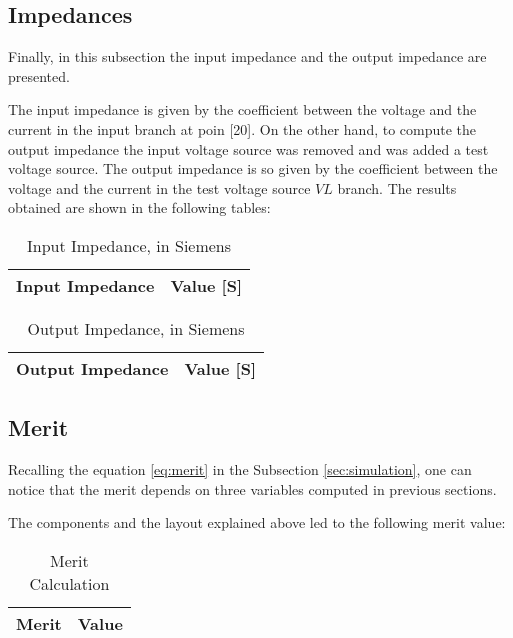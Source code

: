\subsection{Impedances}
\label{impedances}
\par Finally, in this subsection the input impedance and the output impedance are presented.
\par The input impedance is given by the coefficient between the voltage and the current in the input branch at poin [20]. On the other hand, to compute the output impedance the input voltage source was removed and was added a test voltage source. The output impedance is so given by the coefficient between the voltage and the current in the test voltage source $VL$ branch. The results obtained are shown in the following tables:

\begin{table}[H]
  \centering
  \begin{tabular}{|l|r|}
    \hline    
    {\bf Input Impedance} & {\bf Value [S]} \\ \hline
    
  \end{tabular}
  \caption{Input Impedance, in Siemens}
  \label{tab:input_z}
\end{table}


\begin{table}[H]
  \centering
  \begin{tabular}{|l|r|}
    \hline    
    {\bf Output Impedance} & {\bf Value [S]} \\ \hline
    
  \end{tabular}
  \caption{Output Impedance, in Siemens}
  \label{tab:output_z}
\end{table}





\subsection{Merit}
\label{subsec:merit}

\par Recalling the equation \ref{eq:merit} in the Subsection \ref{sec:simulation}, one can notice that the merit depends on three variables computed in previous sections.
\par The components and the layout explained above led to the following merit value:

\begin{table}[H]
  \centering
  \begin{tabular}{ |l|r| } 
    \hline    
    {\bf Merit} & {\bf Value} \\ \hline
    
  \end{tabular}
  \caption{Merit Calculation}
  \label{tab:merit}
\end{table}

